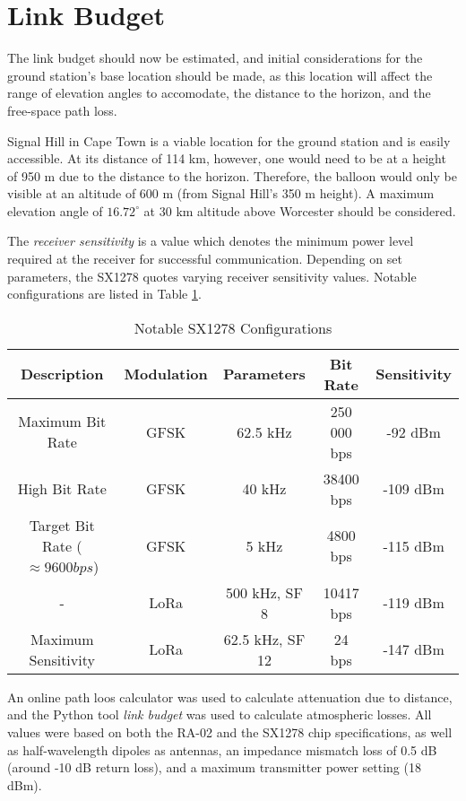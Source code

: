 \section{Link Budget}

The link budget should now be estimated, and initial considerations for the ground station's base location should be made, as this location will affect the range of elevation angles to accomodate, the distance to the horizon, and the free-space path loss.

Signal Hill in Cape Town is a viable location for the ground station and is easily accessible. At its distance of 114 km, however, one would need to be at a height of 950 m due to the distance to the horizon. Therefore, the balloon would only be visible at an altitude of 600 m (from Signal Hill's 350 m height). A maximum elevation angle of $16.72^\circ$ at 30 km altitude above Worcester should be considered.

\newpage
The \textit{receiver sensitivity} is a value which denotes the minimum power level required at the receiver for successful communication. Depending on set parameters, the SX1278 quotes varying receiver sensitivity values. Notable configurations are listed in Table \ref{tab:sensitivity_values}.
\begin{table}[!htb]
  \centering
  \renewcommand{\arraystretch}{1.2}
  \begin{tabular}{ |c|c|c|c|c| }
  \hline
  \textbf{Description} & \textbf{Modulation} & \textbf{Parameters} & \textbf{Bit Rate} & \textbf{Sensitivity} \\
  \hline
  Maximum Bit Rate &
  GFSK &
  62.5 kHz &
  250 000 bps &
  -92 dBm \\
  \hline
  High Bit Rate &
  GFSK &
  40 kHz &
  38400 bps &
  -109 dBm \\
  \hline
  Target Bit Rate ($\approx 9600 bps$) &
  GFSK &
  5 kHz &
  4800 bps &
  -115 dBm \\
  \hline
  - &
  LoRa &
  500 kHz, SF 8 &
  10417 bps &
  -119 dBm \\
  \hline
  Maximum Sensitivity &
  LoRa &
  62.5 kHz, SF 12 &
  24 bps &
  -147 dBm \\
  \hline
  \end{tabular}
  \caption{Notable SX1278 Configurations}
  \label{tab:sensitivity_values}
\end{table}

An online path loos calculator was used to calculate attenuation due to distance, and the Python tool \textit{link budget} was used to calculate atmospheric losses. All values were based on both the RA-02 and the SX1278 chip specifications, as well as half-wavelength dipoles as antennas, an impedance mismatch loss of 0.5 dB (around -10 dB return loss), and a maximum transmitter power setting (18 dBm).


